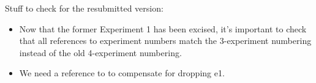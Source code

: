 Stuff to check for the resubmitted version:

\begin{itemize}
\item Now that the former Experiment 1 has been excised, it's important to check that all references to experiment numbers match the 3-experiment numbering instead of the old 4-experiment numbering.
\item We need a reference to \citet{green2013utility} to compensate for dropping e1.
\end{itemize}
